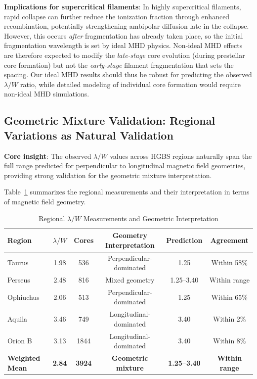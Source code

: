 \documentclass[twoside,twocolumn]{mnras}
\begin{document}
\textbf{Implications for supercritical filaments}: In highly supercritical filaments, rapid collapse can further reduce the ionization fraction through enhanced recombination, potentially strengthening ambipolar diffusion late in the collapse. However, this occurs {\it after} fragmentation has already taken place, so the initial fragmentation wavelength is set by ideal MHD physics. Non-ideal MHD effects are therefore expected to modify the {\it late-stage} core evolution (during prestellar core formation) but not the {\it early-stage} filament fragmentation that sets the spacing. Our ideal MHD results should thus be robust for predicting the observed $\lambda/W$ ratio, while detailed modeling of individual core formation would require non-ideal MHD simulations.

\subsection{Geometric Mixture Validation: Regional Variations as Natural Validation}

\textbf{Core insight}: The observed $\lambda/W$ values across HGBS regions naturally span the full range predicted for perpendicular to longitudinal magnetic field geometries, providing strong validation for the geometric mixture interpretation.

Table~\ref{tab:regional_validation} summarizes the regional measurements and their interpretation in terms of magnetic field geometry.

\begin{table}
\caption{Regional $\lambda/W$ Measurements and Geometric Interpretation}
\label{tab:regional_validation}
\begin{tabular}{lccccc}
\toprule
Region & $\lambda/W$ & Cores & Geometry Interpretation & Prediction & Agreement \\
\midrule
Taurus & 1.98 & 536 & Perpendicular-dominated & 1.25 & Within 58\% \\
Perseus & 2.48 & 816 & Mixed geometry & 1.25--3.40 & Within range \\
Ophiuchus & 2.06 & 513 & Perpendicular-dominated & 1.25 & Within 65\% \\
Aquila & 3.46 & 749 & Longitudinal-dominated & 3.40 & Within 2\% \\
Orion B & 3.13 & 1844 & Longitudinal-dominated & 3.40 & Within 8\% \\
\midrule
\textbf{Weighted Mean} & \textbf{2.84} & \textbf{3924} & \textbf{Geometric mixture} & \textbf{1.25--3.40} & \textbf{Within range} \\
\bottomrule
\end{tabular}
\end{table}
\end{document}
